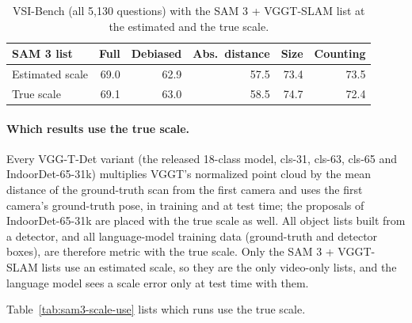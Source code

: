 \begin{table}[t]
\centering
\caption{VSI-Bench (all 5,130 questions) with the SAM 3 + VGGT-SLAM list at the estimated and the true scale.}
\label{tab:sam3-scale-vsi}
\begin{tabular}{lrrrrr}
\toprule
SAM 3 list & Full & Debiased & Abs.\ distance & Size & Counting \\
\midrule
Estimated scale & 69.0 & 62.9 & 57.5 & 73.4 & 73.5 \\
True scale      & 69.1 & 63.0 & 58.5 & 74.7 & 72.4 \\
\bottomrule
\end{tabular}
\end{table}

\paragraph{Which results use the true scale.} Every VGG-T-Det variant (the released 18-class model, cls-31, cls-63,
cls-65 and IndoorDet-65-31k) multiplies VGGT's normalized point cloud by the mean distance of the ground-truth scan
from the first camera and uses the first camera's ground-truth pose, in training and at test time; the proposals of
IndoorDet-65-31k are placed with the true scale as well. All object lists built from a detector, and all language-model
training data (ground-truth and detector boxes), are therefore metric with the true scale. Only the SAM 3 + VGGT-SLAM
lists use an estimated scale, so they are the only video-only lists, and the language model sees a scale error only
at test time with them.

Table~\ref{tab:sam3-scale-use} lists which runs use the true scale.

